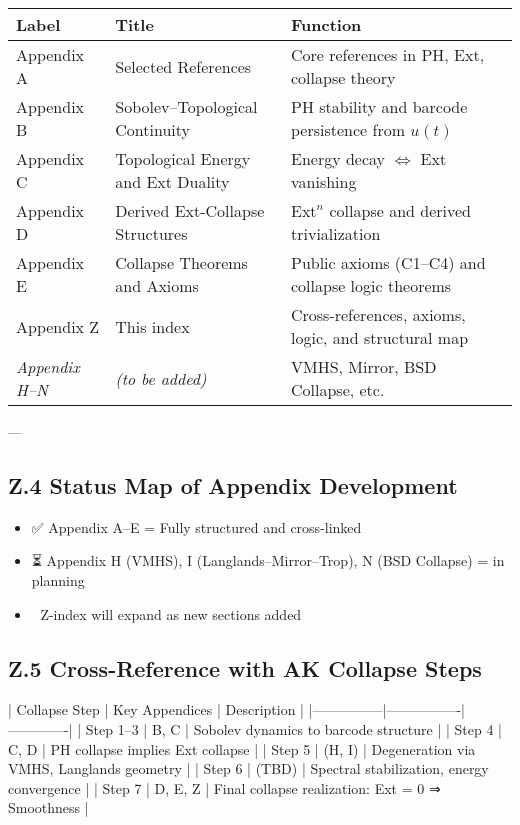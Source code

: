 \documentclass[11pt]{article}
\begin{document}
\begin{tabular}{lll}
\textbf{Label} & \textbf{Title} & \textbf{Function} \\
\hline
Appendix A & Selected References & Core references in PH, Ext, collapse theory \\
Appendix B & Sobolev–Topological Continuity & PH stability and barcode persistence from $u(t)$ \\
Appendix C & Topological Energy and Ext Duality & Energy decay $\Leftrightarrow$ Ext vanishing \\
Appendix D & Derived Ext-Collapse Structures & $\mathrm{Ext}^n$ collapse and derived trivialization \\
Appendix E & Collapse Theorems and Axioms & Public axioms (C1–C4) and collapse logic theorems \\
Appendix Z & This index & Cross-references, axioms, logic, and structural map \\
\hline
\textit{Appendix H–N} & \textit{(to be added)} & VMHS, Mirror, BSD Collapse, etc. \\
\end{tabular}

---

\subsection*{Z.4 Status Map of Appendix Development}

\begin{itemize}
  \item ✅ Appendix A–E = Fully structured and cross-linked
  \item ⏳ Appendix H (VMHS), I (Langlands–Mirror–Trop), N (BSD Collapse) = in planning
  \item 🧩 Z-index will expand as new sections added
\end{itemize}

\subsection*{Z.5 Cross-Reference with AK Collapse Steps}

| Collapse Step | Key Appendices | Description |
|---------------|----------------|-------------|
| Step 1–3 | B, C | Sobolev dynamics to barcode structure |
| Step 4 | C, D | PH collapse implies Ext collapse |
| Step 5 | (H, I)\* | Degeneration via VMHS, Langlands geometry |
| Step 6 | (TBD) | Spectral stabilization, energy convergence |
| Step 7 | D, E, Z | Final collapse realization: Ext = 0 ⇒ Smoothness |
\end{document}
